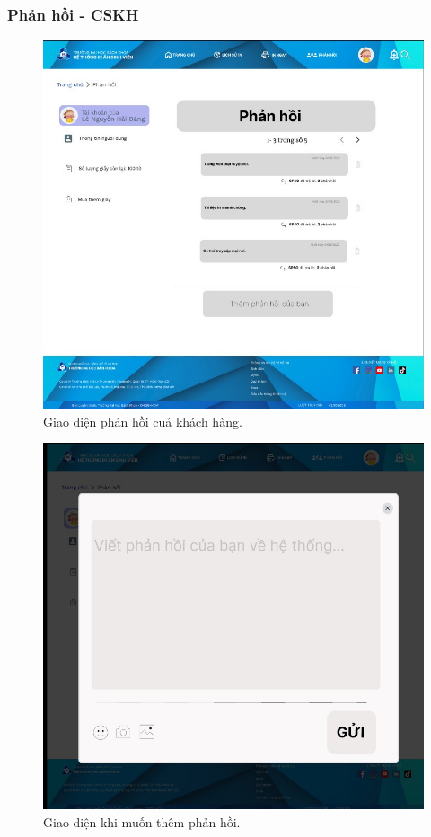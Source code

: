 \subsubsection{Phản hồi - CSKH}
\begin{figure}[H]
    \begin{center}
        \includegraphics[width=1\textwidth]{Images/Figma/comment.png}
        \caption{Giao diện phản hồi cuả khách hàng.}
        \label{fig:arch}
    \end{center}
\end{figure}
\begin{figure}[H]
    \begin{center}
        \includegraphics[width=1\textwidth]{Images/Figma/add_cmt.png}
        \caption{Giao diện khi muốn thêm phản hồi.}
        \label{fig:arch}
    \end{center}
\end{figure}
